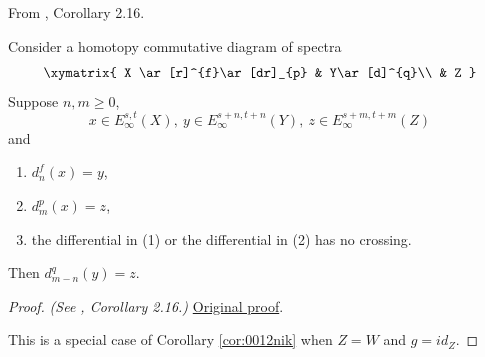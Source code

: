 \begin{corollary}
\label{paper:2.16}
From \cite{LWX126}, Corollary 2.16.\par
\label{cor:166dc180}
    Consider a homotopy commutative diagram of spectra
    $$\xymatrix{
    X \ar[r]^{f}\ar[dr]_{p} & Y\ar[d]^{q}\\
    & Z
    }$$
    Suppose $n,m\ge 0$, 
    $$x\in E^{s,t}_\infty(X), ~y\in E^{s+n,t+n}_\infty(Y), ~z\in E^{s+m,t+m}_\infty(Z)$$
    and
    \begin{enumerate}
        \item $d^{f}_{n}(x)=y$,
        \item $d^{p}_{m}(x)=z$,
        \item the differential in (1) or the differential in (2) has no crossing.
    \end{enumerate}
    Then $d^{q}_{m-n}(y)=z$.



\end{corollary}
\begin{proof}
\textit{(See \cite{LWX126}, Corollary 2.16.)} \href{paper/main.tex.html#L593}{Original proof}.

This is a special case of Corollary \ref{cor:0012nik} when $Z=W$ and $g=id_Z$.
\end{proof}

